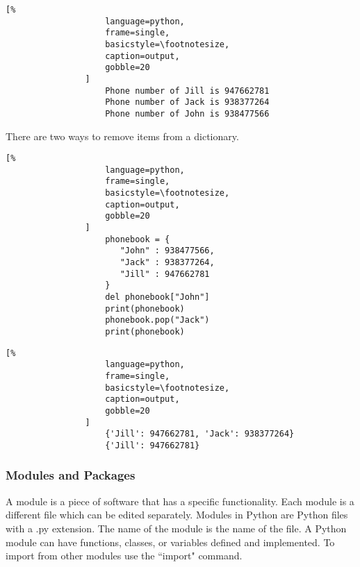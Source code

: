 \documentclass[crop=false,class=article,oneside]{standalone}
\begin{document}
            \begin{minipage}[t]{.48\textwidth}
                \centering
                \begin{lstlisting}[%
                    language=python,
                    frame=single,
                    basicstyle=\footnotesize,
                    caption=output,
                    gobble=20
                ]
                    Phone number of Jill is 947662781
                    Phone number of Jack is 938377264
                    Phone number of John is 938477566
                \end{lstlisting}
            \end{minipage}
            There are two ways to remove items from a
            dictionary.\newline
            \begin{minipage}[t]{.48\textwidth}
                \centering
                \begin{lstlisting}[%
                    language=python,
                    frame=single,
                    basicstyle=\footnotesize,
                    caption=output,
                    gobble=20
                ]
                    phonebook = {
                       "John" : 938477566,
                       "Jack" : 938377264,
                       "Jill" : 947662781
                    }
                    del phonebook["John"]
                    print(phonebook)
                    phonebook.pop("Jack")
                    print(phonebook)
                \end{lstlisting}
            \end{minipage}\hfill
            \begin{minipage}[t]{.48\textwidth}
                \centering
                \begin{lstlisting}[%
                    language=python,
                    frame=single,
                    basicstyle=\footnotesize,
                    caption=output,
                    gobble=20
                ]
                    {'Jill': 947662781, 'Jack': 938377264}
                    {'Jill': 947662781}
                \end{lstlisting}
            \end{minipage}
        \subsubsection{Modules and Packages}
        A module is a piece of software that has a specific
        functionality. Each module is a different file which can be
        edited separately. Modules in Python are Python files with a
        .py extension. The name of the module is the name of the
        file. A Python module can have functions, classes, or
        variables defined and implemented. To import from other
        modules use the ``import" command.
\end{document}
